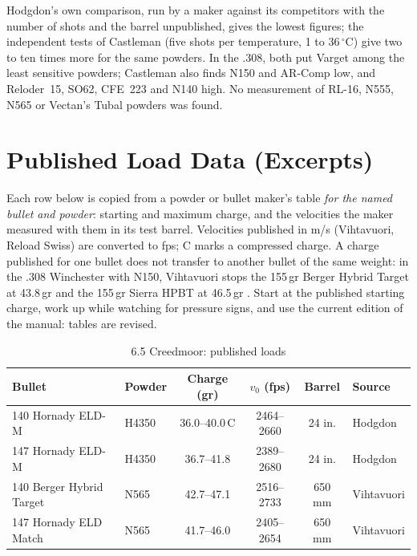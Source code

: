 \documentclass[11pt,twoside,openright]{report}
\begin{document}
Hodgdon's own comparison, run by a maker against its competitors with the number of shots and the barrel unpublished, gives the lowest figures; the independent tests of Castleman (five shots per temperature, 1 to 36\,$^\circ$C) give two to ten times more for the same powders. In the .308, both put Varget among the least sensitive powders; Castleman also finds N150 and AR-Comp low, and Reloder~15, SO62, CFE~223 and N140 high. No measurement of RL-16, N555, N565 or Vectan's Tubal powders was found.

\section{Published Load Data (Excerpts)}
\label{sec:load_data}

Each row below is copied from a powder or bullet maker's table \emph{for the named bullet and powder}: starting and maximum charge, and the velocities the maker measured with them in its test barrel. Velocities published in m/s (Vihtavuori, Reload Swiss) are converted to fps; C marks a compressed charge. A charge published for one bullet does not transfer to another bullet of the same weight: in the .308 Winchester with N150, Vihtavuori stops the 155\,gr Berger Hybrid Target at 43.8\,gr and the 155\,gr Sierra HPBT at 46.5\,gr \citep{vihtavuori2026}. Start at the published starting charge, work up while watching for pressure signs, and use the current edition of the manual: tables are revised.

\begin{table}[H]
\centering
\caption{6.5 Creedmoor: published loads \citep{hodgdon2024,vihtavuori2026}}
\label{tab:65cm_loads}
\begin{tabular}{@{}llcccl@{}}
\toprule
\textbf{Bullet} & \textbf{Powder} & \textbf{Charge (gr)} & \textbf{$v_0$ (fps)} & \textbf{Barrel} & \textbf{Source} \\
\midrule
140 Hornady ELD-M & H4350 & 36.0--40.0\,C & 2464--2660 & 24 in. & Hodgdon \\
147 Hornady ELD-M & H4350 & 36.7--41.8 & 2389--2680 & 24 in. & Hodgdon \\
140 Berger Hybrid Target & N565 & 42.7--47.1 & 2516--2733 & 650 mm & Vihtavuori \\
147 Hornady ELD Match & N565 & 41.7--46.0 & 2405--2654 & 650 mm & Vihtavuori \\
\bottomrule
\end{tabular}
\end{table}
\end{document}
